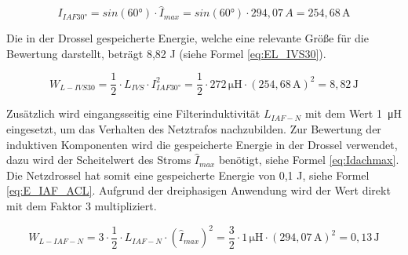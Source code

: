 		
		
		\begin{equation}
			\label{eq:IAF_I30}
			I_{IAF30°}= sin(60°)\cdot \hat{I}_{max}=sin(60°)\cdot 294,07 \,A =254,68\, \si{\A}
		\end{equation}
		
		
		Die in der Drossel gespeicherte Energie, welche eine relevante Größe für die Bewertung darstellt, beträgt 8,82 \si{\joule} (siehe Formel \ref{eq:EL_IVS30}).
		
		\begin{equation}
			\label{eq:EL_IVS30}
			W_{L-IVS30}=\dfrac{1}{2} \cdot L_{IVS} \cdot I_{IAF30°}^{2} = \dfrac{1}{2}\cdot 272\, \si{\micro \henry} \cdot (254,68\, \si{\A})^{2} =  8,82 \, \si{\joule}
		\end{equation}
		
		
		
		Zusätzlich wird eingangsseitig eine Filterinduktivität $L_{IAF-N}$ mit dem Wert 1~\si{\micro \henry} eingesetzt, um das Verhalten des Netztrafos nachzubilden. Zur Bewertung der induktiven Komponenten wird die gespeicherte Energie in der Drossel verwendet, dazu wird der Scheitelwert des Stroms $\hat{I}_{max}$ benötigt, siehe Formel \ref{eq:Idachmax}. Die Netzdrossel hat somit eine gespeicherte Energie von 0,1 \si{\joule}, siehe Formel \ref{eq:E_IAF_ACL}. Aufgrund der dreiphasigen Anwendung wird der Wert direkt mit dem Faktor 3 multipliziert.
			
			\begin{equation}
			\label{eq:E_IAF_ACL}
			W_{L-IAF-N}= 3\cdot \dfrac{1}{2} \cdot L_{IAF-N} \cdot (\hat{I}_{max})^2=\dfrac{3}{2} \cdot 1\, \si{\micro \henry} \cdot (294,07 \, \si{\ampere})^{2} = 0,13 \, \si{\joule}
		\end{equation}
	
